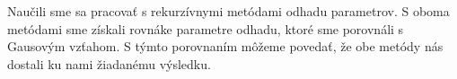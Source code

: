 Naučili sme sa pracovať s rekurzívnymi metódami odhadu parametrov. S oboma metódami sme získali rovnáke parametre odhadu, ktoré sme porovnáli s Gausovým vzťahom. S týmto porovnaním môžeme povedať, že obe metódy nás dostali ku nami žiadanému výsledku.